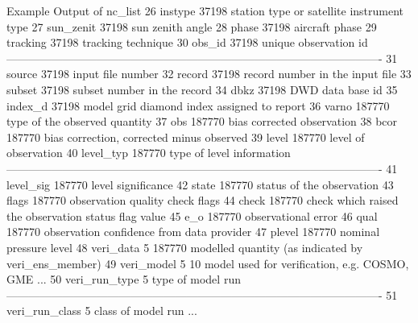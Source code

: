 \begin{codeonlysmall}{Example Output of nc\_list}
26   instype                        37198             station type or satellite instrument type
27   sun_zenit                      37198             sun zenith angle              
28   phase                          37198             aircraft phase                
29   tracking                       37198             tracking technique            
30   obs_id                         37198             unique observation id         
----------------------------------------------------------------------------------------------------
31   source                         37198             input file number             
32   record                         37198             record number in the input file
33   subset                         37198             subset number in the record   
34   dbkz                           37198             DWD data base id              
35   index_d                        37198             model grid diamond index assigned to report
36   varno                         187770             type of the observed quantity 
37   obs                           187770             bias corrected observation    
38   bcor                          187770             bias correction, corrected minus observed
39   level                         187770             level of observation          
40   level_typ                     187770             type of level information     
----------------------------------------------------------------------------------------------------
41   level_sig                     187770             level significance            
42   state                         187770             status of the observation     
43   flags                         187770             observation quality check flags
44   check                         187770             check which raised the observation status flag value
45   e_o                           187770             observational error           
46   qual                          187770             observation confidence from data provider
47   plevel                        187770             nominal pressure level        
48   veri_data                          5     187770  modelled quantity (as indicated by veri_ens_member)
49   veri_model                         5         10  model used for verification, e.g. COSMO, GME ...
50   veri_run_type                      5             type of model run             
----------------------------------------------------------------------------------------------------
51   veri_run_class                     5             class of model run            
...
\end{codeonlysmall}

